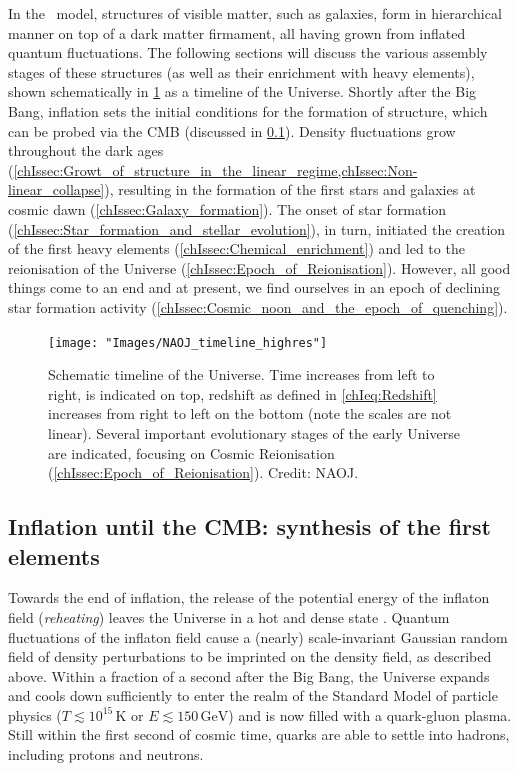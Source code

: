 In the \LCDM\ model, structures of visible matter, such as galaxies, form in hierarchical manner on top of a dark matter firmament, all having grown from inflated quantum fluctuations. The following sections will discuss the various assembly stages of these structures (as well as their enrichment with heavy elements), shown schematically in \cref{chIfig:Cosmic_timeline} as a timeline of the Universe. Shortly after the Big Bang, inflation sets the initial conditions for the formation of structure, which can be probed via the CMB (discussed in \cref{chIssec:Inflation_until_CMB}). Density fluctuations grow throughout the dark ages (\cref{chIssec:Growt_of_structure_in_the_linear_regime,chIssec:Non-linear_collapse}), resulting in the formation of the first stars and galaxies at cosmic dawn (\cref{chIssec:Galaxy_formation}). The onset of star formation (\cref{chIssec:Star_formation_and_stellar_evolution}), in turn, initiated the creation of the first heavy elements (\cref{chIssec:Chemical_enrichment}) and led to the reionisation of the Universe (\cref{chIssec:Epoch_of_Reionisation}). However, all good things come to an end and at present, we find ourselves in an epoch of declining star formation activity (\cref{chIssec:Cosmic_noon_and_the_epoch_of_quenching}).
\begin{figure}
    \centering
    \texttt{[image: "Images/NAOJ\_timeline\_highres"]}
    \caption[Schematic timeline of the Universe.]{Schematic timeline of the Universe. Time increases from left to right, is indicated on top, redshift as defined in \cref{chIeq:Redshift} increases from right to left on the bottom (note the scales are not linear). Several important evolutionary stages of the early Universe are indicated, focusing on Cosmic Reionisation (\cref{chIssec:Epoch_of_Reionisation}). Credit: NAOJ.}
    \label{chIfig:Cosmic_timeline}
\end{figure}

\subsection{Inflation until the CMB: synthesis of the first elements}
\label{chIssec:Inflation_until_CMB}

Towards the end of inflation, the release of the potential energy of the inflaton field (\textit{reheating}) leaves the Universe in a hot and dense state \citep[ultimately the source of the blackbody nature of the CMB;][]{1994PhRvL..73.3195K}. Quantum fluctuations of the inflaton field cause a (nearly) scale-invariant Gaussian random field of density perturbations to be imprinted on the density field, as described above. Within a fraction of a second after the Big Bang, the Universe expands and cools down sufficiently to enter the realm of the Standard Model of particle physics ($T \lesssim 10^{15} \, \mathrm{K}$ or $E \lesssim 150 \, \mathrm{GeV}$) and is now filled with a quark-gluon plasma. Still within the first second of cosmic time, quarks are able to settle into hadrons, including protons and neutrons.

